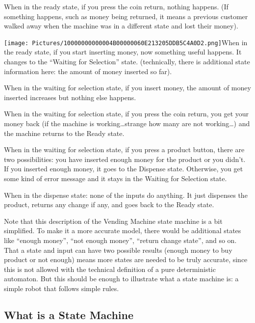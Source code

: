 When in the ready state, if you press the coin return, nothing happens.
(If something happens, such as money being returned, it means a previous
customer walked away when the machine was in a different state and lost
their money).

\texttt{[image: Pictures/10000000000004B00000060E213205DDB5C4A0D2.png]}When
in the ready state, if you start inserting money, now something useful
happens. It changes to the ``Waiting for Selection'' state.
(technically, there is additional state information here: the amount of
money inserted so far).

When in the waiting for selection state, if you insert money, the amount
of money inserted increases but nothing else happens.

When in the waiting for selection state, if you press the coin return,
you get your money back (if the machine is working\ldots{}strange how
many are not working\ldots{}) and the machine returns to the Ready
state.

When in the waiting for selection state, if you press a product button,
there are two possibilities: you have inserted enough money for the
product or you didn't. If you inserted enough money, it goes to the
Dispense state. Otherwise, you get some kind of error message and it
stays in the Waiting for Selection state.

When in the dispense state: none of the inputs do anything. It just
dispenses the product, returns any change if any, and goes back to the
Ready state.

Note that this description of the Vending Machine state machine is a bit
simplified. To make it a more accurate model, there would be additional
states like ``enough money'', ``not enough money'', ``return change
state'', and so on. That a state and input can have two possible results
(enough money to buy product or not enough) means more states are needed
to be truly accurate, since this is not allowed with the technical
definition of a pure deterministic automaton. But this should be enough
to illustrate what a state machine is: a simple robot that follows
simple rules.

\subsection[What is a State
Machine]{\texorpdfstring{\protect\hypertarget{anchor-3}{}{}What is a
State Machine}{What is a State Machine}}\label{what-is-a-state-machine}

